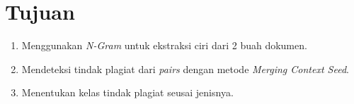 \documentclass[../Proposal.tex]{subfiles}
\begin{document}
	\section{Tujuan}
		\begin{enumerate}
			\item Menggunakan \textit{N-Gram} untuk ekstraksi ciri dari 2 buah dokumen.
			\item Mendeteksi tindak plagiat dari \textit{pairs} dengan metode \textit{Merging Context Seed}.
			\item Menentukan kelas tindak plagiat seusai jenisnya.
		\end{enumerate}
\end{document}
